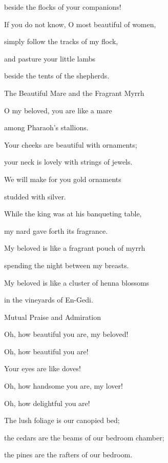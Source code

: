 {\par }{\Q beside the flocks
of your companions!
\par }{\SH 
{}
\par }{\Q {}If
you do not
know,
O most beautiful
of women,
\par }{\Q simply follow
the tracks
of my flock,
\par }{\Q and pasture
your little lambs
\par }{\Q beside
the tents
of the shepherds.
\par }{\SH The Beautiful Mare and the Fragrant Myrrh
\par }{\SH 
{}
\par }{\Q {}O my beloved,
you are like
a mare
\par }{\Q among Pharaoh’s
stallions.
\par }{\Q {}Your cheeks
are beautiful
with ornaments;
\par }{\Q your neck
is lovely with strings of jewels.
\par }{\Q {}We will make
for you gold
ornaments
\par }{\Q studded
with
silver.
\par }{\SH 
{}
\par }{\Q {}While
the king
was at his banqueting table,
\par }{\Q my nard
gave
forth its fragrance.
\par }{\Q {}My beloved
is like a fragrant pouch
of myrrh
\par }{\Q spending the night
between
my breasts.
\par }{\Q {}My beloved
is like a cluster
of henna
blossoms
\par }{\Q in the vineyards
of En-Gedi.
\par }{\SH Mutual Praise and Admiration
\par }{\SH 
{}
\par }{\Q {}Oh,
how beautiful
you are, my beloved!

\par }{\Q Oh,
how beautiful
you are!
\par }{\Q Your eyes
are like doves!
\par }{\SH 
{}
\par }{\Q {}Oh, how handsome
you are, my lover!

\par }{\Q Oh, how
delightful
you are!
\par }{\Q The lush foliage is our canopied bed;
\par }{\Q {}the cedars
are the beams
of our bedroom chamber;
\par }{\Q the pines
are the rafters of our bedroom.

}
